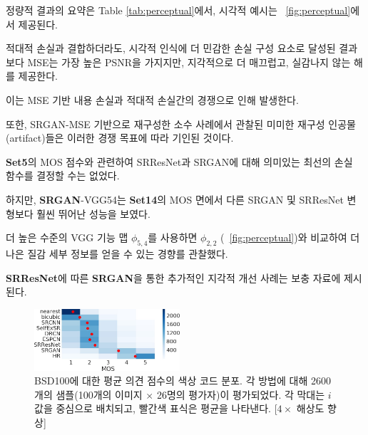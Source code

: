 \documentclass[10pt,twocolumn,letterpaper]{article}
\newcommand{\kor}[1]{#1}
\newcommand{\eng}[1]{}
\begin{document}
\eng{
Quantitative results are summarized in Table \ref{tab:perceptual} and visual examples provided in \figurename~\ref{fig:perceptual}.
}\kor{
정량적 결과의 요약은 Table \ref{tab:perceptual}에서, 시각적 예시는 \figurename~\ref{fig:perceptual}에서 제공된다.
}
\eng{
Even combined with the adversarial loss, \ac{MSE} provides solutions with the highest \ac{PSNR} values that are, however, perceptually rather smooth and less convincing than results achieved with a loss component more sensitive to visual perception.
}\kor{
적대적 손실과 결합하더라도, 시각적 인식에 더 민감한 손실 구성 요소로 달성된 결과보다 \ac{MSE}는 가장 높은 \ac{PSNR}을 가지지만, 지각적으로 더 매끄럽고, 실감나지 않는 해를 제공한다.
} \eng{
This is caused by competition between the \ac{MSE}-based content loss and the adversarial loss.
}\kor{
이는 \ac{MSE} 기반 내용 손실과 적대적 손실간의 경쟁으로 인해 발생한다.
} \eng{
We further attribute minor reconstruction artifacts, which we observed in a minority of SRGAN-MSE-based reconstructions, to those competing objectives.
}\kor{
또한, SRGAN-MSE 기반으로 재구성한 소수 사례에서 관찰된 미미한 재구성 인공물(artifact)들은 이러한 경쟁 목표에 따라 기인된 것이다.
} \eng{
We could not determine a significantly best loss function for SRResNet or SRGAN with respect to \ac{MOS} score on \textbf{Set5}.
}\kor{
\textbf{Set5}의 \ac{MOS} 점수와 관련하여 SRResNet과 SRGAN에 대해 의미있는 최선의 손실 함수를 결정할 수는 없었다.
} \eng{
However, \textbf{SRGAN}-VGG54 significantly outperformed other SRGAN and SRResNet variants on \textbf{Set14} in terms of \ac{MOS}.
}\kor{
하지만, \textbf{SRGAN}-VGG54는 \textbf{Set14}의 \ac{MOS} 면에서 다른 SRGAN 및 SRResNet 변형보다 훨씬 뛰어난 성능을 보였다.
}
\eng{
We observed a trend that using the higher level VGG feature maps $\phi_{5,4}$ yields better texture detail when compared to $\phi_{2,2}$ (\cf \figurename~\ref{fig:perceptual}).
}\kor{
더 높은 수준의 VGG 기능 맵 $\phi_{5,4}$를 사용하면 $\phi_{2,2}$ (\cf \figurename~\ref{fig:perceptual})와 비교하여 더 나은 질감 세부 정보를 얻을 수 있는 경향를 관찰했다.
}
\eng{
Further examples of perceptual improvements through \textbf{SRGAN} over \textbf{SRResNet} are provided in the supplementary material.
}\kor{
\textbf{SRResNet}에 따른 \textbf{SRGAN}을 통한 추가적인 지각적 개선 사례는 보충 자료에 제시된다.
}
\begin{figure}[ht!]
\includegraphics[width=0.48\textwidth]{images/used/jpg/MOS_heatmapcropped}
\caption{\eng{Color-coded distribution of MOS scores on \textbf{BSD100}. For each method 2600 samples (100 images $\times$ 26 raters) were assessed. Mean shown as red marker, where the bins are centered around value $i$. [$4\times$ upscaling]}\kor{BSD100에 대한 평균 의견 점수의 색상 코드 분포. 각 방법에 대해 2600개의 샘플(100개의 이미지 $\times$ 26명의 평가자)이 평가되었다. 각 막대는 $i$ 값을 중심으로 배치되고, 빨간색 표식은 평균을 나타낸다. [$4\times$ 해상도 향상]}}
\label{fig:MOS}
\end{figure}
\end{document}
